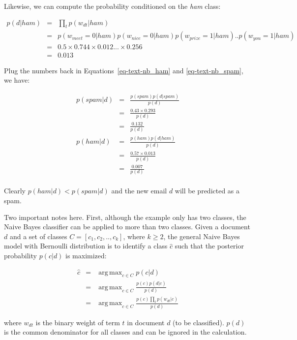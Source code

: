 \documentclass[
  letterpaper,
]{scrbook}
\begin{document}
Likewise, we can compute the probability conditioned on the \emph{ham}
class:

\[\begin{aligned}
  p(d|ham)
  & = & \prod_{t} p(w_{dt}|ham) \\
  & = & p(w_{meet}=0|ham) p(w_{nice}=0|ham) p(w_{prize}=1|ham) .. p(w_{you}=1|ham) \\
  & = & 0.5 \times 0.744 \times 0.012 ... \times 0.256 \\
  & = & 0.013
\end{aligned}\]

Plug the numbers back in
Equations~\hyperref[eq-text-nb_ham]{{[}eq-text-nb\_ham{]}} and
\hyperref[eq-text-nb_spam]{{[}eq-text-nb\_spam{]}}, we have:

\[\begin{aligned}
  p(spam|d)
  & = & \frac{p(spam)p(d|spam)}{p(d)}  \\
  & = & \frac{0.43 \times 0.293}{p(d)} \\
  & = & \frac{0.132}{p(d)} \\
  p(ham|d)
  & = & \frac{p(ham)p(d|ham)}{p(d)} \\
  & = & \frac{0.57 \times 0.013}{p(d)} \\
  & = & \frac{0.007}{p(d)} \\
\end{aligned}\]

Clearly \(p(ham|d) < p(spam|d)\) and the new email \(d\) will be
predicted as a spam.

Two important notes here. First, although the example only has two
classes, the Naive Bayes classifier can be applied to more than two
classes. Given a document \(d\) and a set of classes
\(C = [c_1, c_2, .., c_k]\), where \(k \ge 2\), the general Naive Bayes
model with Bernoulli distribution is to identify a class \(\hat{c}\)
such that the posterior probability \(p(c|d)\) is maximized:

\[\begin{aligned}
  \hat{c}
  & = & \mathop{\mathrm{arg\,max}}_{c \in C} p(c|d) \\
  & = & \mathop{\mathrm{arg\,max}}_{c \in C} \frac{p(c)p(d|c)}{p(d)} \\
  & = & \mathop{\mathrm{arg\,max}}_{c \in C} \frac{p(c)\prod_{t} p(w_{dt}|c)}{p(d)}
\end{aligned}\]

where \(w_{dt}\) is the binary weight of term \(t\) in document \(d\)
(to be classified). \(p(d)\) is the common denominator for all classes
and can be ignored in the calculation.
\end{document}
